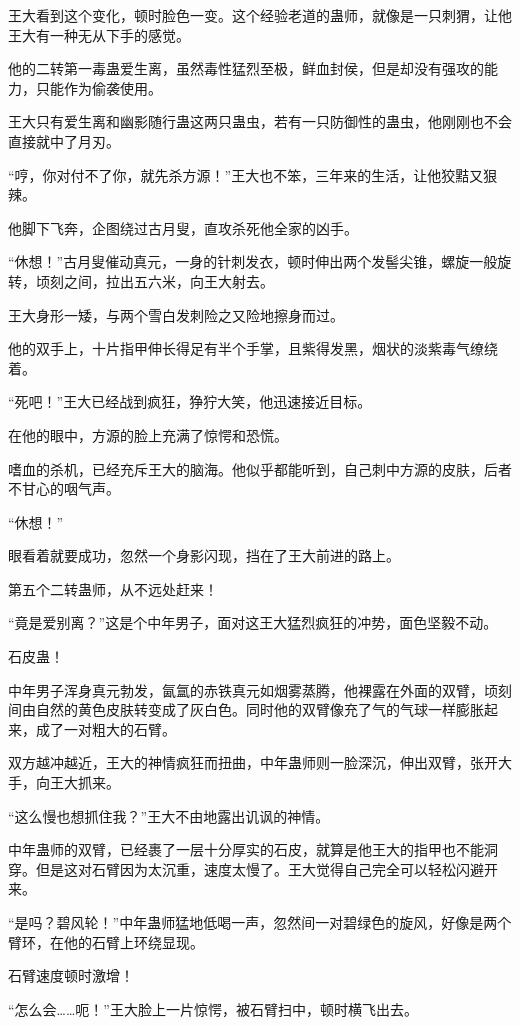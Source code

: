 \begin{this_body}
王大看到这个变化，顿时脸色一变。这个经验老道的蛊师，就像是一只刺猬，让他王大有一种无从下手的感觉。

他的二转第一毒蛊爱生离，虽然毒性猛烈至极，鲜血封侯，但是却没有强攻的能力，只能作为偷袭使用。

王大只有爱生离和幽影随行蛊这两只蛊虫，若有一只防御性的蛊虫，他刚刚也不会直接就中了月刃。

“哼，你对付不了你，就先杀方源！”王大也不笨，三年来的生活，让他狡黠又狠辣。

他脚下飞奔，企图绕过古月叟，直攻杀死他全家的凶手。

“休想！”古月叟催动真元，一身的针刺发衣，顿时伸出两个发髻尖锥，螺旋一般旋转，顷刻之间，拉出五六米，向王大射去。

王大身形一矮，与两个雪白发刺险之又险地擦身而过。

他的双手上，十片指甲伸长得足有半个手掌，且紫得发黑，烟状的淡紫毒气缭绕着。

“死吧！”王大已经战到疯狂，狰狞大笑，他迅速接近目标。

在他的眼中，方源的脸上充满了惊愕和恐慌。

嗜血的杀机，已经充斥王大的脑海。他似乎都能听到，自己刺中方源的皮肤，后者不甘心的咽气声。

“休想！”

眼看着就要成功，忽然一个身影闪现，挡在了王大前进的路上。

第五个二转蛊师，从不远处赶来！

“竟是爱别离？”这是个中年男子，面对这王大猛烈疯狂的冲势，面色坚毅不动。

石皮蛊！

中年男子浑身真元勃发，氤氲的赤铁真元如烟雾蒸腾，他裸露在外面的双臂，顷刻间由自然的黄色皮肤转变成了灰白色。同时他的双臂像充了气的气球一样膨胀起来，成了一对粗大的石臂。

双方越冲越近，王大的神情疯狂而扭曲，中年蛊师则一脸深沉，伸出双臂，张开大手，向王大抓来。

“这么慢也想抓住我？”王大不由地露出讥讽的神情。

中年蛊师的双臂，已经裹了一层十分厚实的石皮，就算是他王大的指甲也不能洞穿。但是这对石臂因为太沉重，速度太慢了。王大觉得自己完全可以轻松闪避开来。

“是吗？碧风轮！”中年蛊师猛地低喝一声，忽然间一对碧绿色的旋风，好像是两个臂环，在他的石臂上环绕显现。

石臂速度顿时激增！

“怎么会……呃！”王大脸上一片惊愕，被石臂扫中，顿时横飞出去。


\end{this_body}
